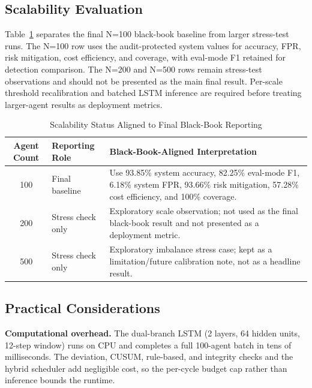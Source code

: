 \documentclass[conference,a4paper]{IEEEtran}
\begin{document}
\subsection{Scalability Evaluation}

Table~\ref{tab:scale} separates the final N=100 black-book baseline from larger stress-test runs. The N=100 row uses the audit-protected system values for accuracy, FPR, risk mitigation, cost efficiency, and coverage, with eval-mode F1 retained for detection comparison. The N=200 and N=500 rows remain stress-test observations and should not be presented as the main final result. Per-scale threshold recalibration and batched LSTM inference are required before treating larger-agent results as deployment metrics.

\begin{table}[htbp]
\caption{Scalability Status Aligned to Final Black-Book Reporting}
\begin{center}
\begin{tabular}{|c|p{2.7cm}|p{4.4cm}|}
\hline
\textbf{Agent Count} & \textbf{Reporting Role} & \textbf{Black-Book-Aligned Interpretation} \\
\hline
100 & Final baseline & Use 93.85\% system accuracy, 82.25\% eval-mode F1, 6.18\% system FPR, 93.66\% risk mitigation, 57.28\% cost efficiency, and 100\% coverage. \\
\hline
200 & Stress check only & Exploratory scale observation; not used as the final black-book result and not presented as a deployment metric. \\
\hline
500 & Stress check only & Exploratory imbalance stress case; kept as a limitation/future calibration note, not as a headline result. \\
\hline
\end{tabular}
\label{tab:scale}
\end{center}
\end{table}

\subsection{Practical Considerations}

\textbf{Computational overhead.} The dual-branch LSTM (2 layers, 64 hidden units, 12-step window) runs on CPU and completes a full 100-agent batch in tens of milliseconds. The deviation, CUSUM, rule-based, and integrity checks and the hybrid scheduler add negligible cost, so the per-cycle budget cap rather than inference bounds the runtime.
\end{document}
